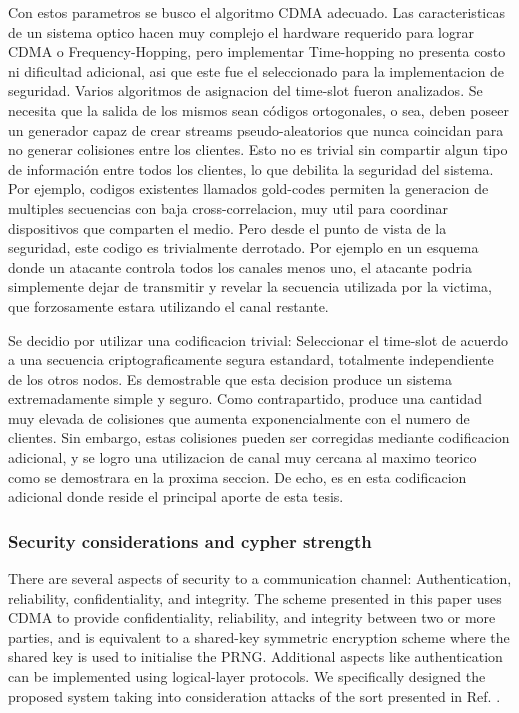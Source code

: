 \documentclass[a4paper,10pt]{report}
\begin{document}
Con estos parametros se busco el algoritmo CDMA adecuado. Las caracteristicas de un sistema optico hacen muy complejo el hardware requerido para lograr CDMA o Frequency-Hopping, pero implementar Time-hopping no presenta costo ni dificultad adicional, asi que este fue el seleccionado para la implementacion de seguridad.
Varios algoritmos de asignacion del time-slot fueron analizados. Se necesita que la salida de los mismos sean códigos ortogonales, o sea, deben poseer un generador capaz de crear streams pseudo-aleatorios que nunca coincidan para no generar colisiones entre los clientes. Esto no es trivial sin compartir algun tipo de información entre todos los clientes, lo que debilita la seguridad del sistema. Por ejemplo, codigos existentes llamados gold-codes permiten la generacion de multiples secuencias con baja cross-correlacion, muy util para coordinar dispositivos que comparten el medio. Pero desde el punto de vista de la seguridad, este codigo es trivialmente derrotado. Por ejemplo en un esquema donde un atacante controla todos los canales menos uno, el atacante podria simplemente dejar de transmitir y revelar la secuencia utilizada por la victima, que forzosamente estara utilizando el canal restante.

Se decidio por utilizar una codificacion trivial: Seleccionar el time-slot de acuerdo a una secuencia criptograficamente segura estandard, totalmente independiente de los otros nodos. Es demostrable que esta decision produce un sistema extremadamente simple y seguro. Como contrapartido, produce una cantidad muy elevada de colisiones que aumenta exponencialmente con el numero de clientes. Sin embargo, estas colisiones pueden ser corregidas mediante codificacion adicional, y se logro una utilizacion de canal muy cercana al maximo teorico como se demostrara en la proxima seccion. De echo, es en esta codificacion adicional donde reside el principal aporte de esta tesis.

\subsubsection{Security considerations and cypher strength}\label{security}
There are several aspects of security to a communication channel: Authentication, reliability, confidentiality, and integrity.
The scheme presented in this paper uses CDMA to provide confidentiality, reliability, and integrity between two or more parties, and is equivalent to a shared-key symmetric encryption scheme where the shared key is used to initialise the PRNG.
Additional aspects like authentication can be implemented using logical-layer protocols.
We specifically designed the proposed system taking into consideration attacks of the sort presented in Ref. \cite{Shake:05}.
\end{document}

